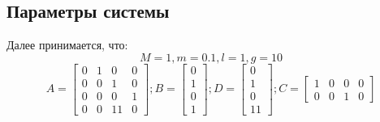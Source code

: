 \FloatBarrier
\subsection{Параметры системы}
Далее принимается, что:
\begin{equation*}
  M = 1, m = 0.1, l = 1, g = 10
\end{equation*}
\[A = \begin{bmatrix}
  0  &  1  &  0  &  0 \\
  0  &  0  &  1  &  0 \\
  0  &  0  &  0  &  1 \\
  0  &  0  &  11  &  0 
\end{bmatrix}; B = \begin{bmatrix}
  0 \\
  1 \\
  0 \\
  1 
\end{bmatrix}; D = \begin{bmatrix}
  0 \\
  1 \\
  0 \\
  11 
\end{bmatrix}; C = \begin{bmatrix}
  1  &  0  &  0  &  0 \\
  0  &  0  &  1  &  0 
\end{bmatrix}\]
